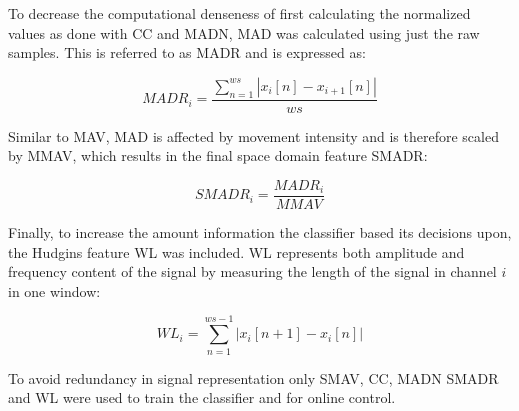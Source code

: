 To decrease the computational denseness of first calculating the normalized values as done with CC and MADN, MAD was calculated using just the raw samples. This is referred to as MADR and is expressed as:

\begin{equation} \label{eq:MADR}
MADR_i=\frac{\sum\limits_{n=1}^{ws}|x_i[n]-x_{i+1}[n]|}{ws}
\end{equation}

Similar to MAV, MAD is affected by movement intensity and is therefore scaled by MMAV, which results in the final space domain feature SMADR: 

\begin{equation} \label{eq:SMADR}
SMADR_i=\frac{MADR_i}{MMAV}
\end{equation}

Finally, to increase the amount information the classifier based its decisions upon, the Hudgins feature WL was included. WL represents both amplitude and frequency content of the signal by measuring the length of the signal in channel $i$ in one window: 

\begin{equation} \label{eq:WL}
WL_i=\sum\limits_{n=1}^{ws-1}|x_{i}[n+1]-x_i[n]|
\end{equation}

To avoid redundancy in signal representation only SMAV, CC, MADN SMADR and WL were used to train the classifier and for online control. 
